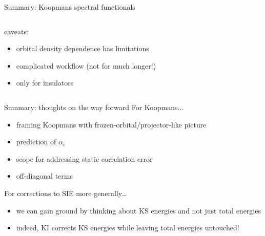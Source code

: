 \documentclass[xcolor=table,aspectratio=169]{beamer}
\numberwithin{equation}{section}
\begin{document}
\begin{frame}{Summary: Koopmans spectral functionals}
\begin{columns}
\begin{column}{0.45\textwidth}
         caveats:
         \begin{itemize}
            \item orbital density dependence has limitations
            \item complicated workflow (not for much longer!)
            \item only for insulators
         \end{itemize}

      \end{column}
   \end{columns}

\end{frame}

\begin{frame}{Summary: thoughts on the way forward}
   For Koopmans...
   \begin{itemize}
      \item framing Koopmans with frozen-orbital/projector-like picture
      \item prediction of $\alpha_i$
      \item scope for addressing static correlation error
      \item off-diagonal terms
   \end{itemize}

   For corrections to SIE more generally\dots
   \begin{itemize}
      \item we can gain ground by thinking about KS energies and not just total energies
      \item indeed, KI corrects KS energies while leaving total energies untouched!
   \end{itemize}

\end{frame}
\end{document}
